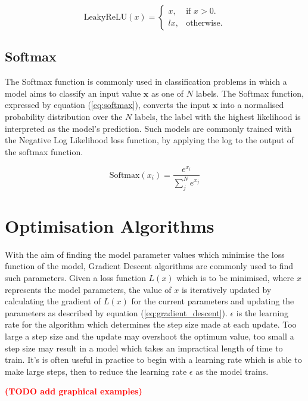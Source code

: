 \begin{equation}\label{eq:lrelu}
    \text{LeakyReLU}(x)=\begin{cases}
      x, & \text{if $x>0$}.\\
      lx, & \text{otherwise}.
    \end{cases}
\end{equation}

\subsection{Softmax} \label{softmax}
The Softmax function is commonly used in classification problems in which a model aims to classify an input value $\bm{x}$ as one of $N$ labels.
The Softmax function, expressed by equation (\ref{eq:softmax}), converts the input $\bm{x}$ into a normalised probability distribution over the $N$ labels, the label with the highest likelihood is interpreted as the model's prediction. 
Such models are commonly trained with the Negative Log Likelihood loss function, by applying the log to the output of the softmax function.

\begin{equation}\label{eq:softmax}
    \text{Softmax}(x_i) = \frac{e^{x_i}}{\sum_j^N e^{x_j}}
\end{equation}

\section{Optimisation Algorithms}
With the aim of finding the model parameter values which minimise the loss function of the model, Gradient Descent algorithms are commonly used to find such parameters.
Given a loss function $L(x)$ which is to be minimised, where $x$ represents the model parameters, the value of $x$ is iteratively updated by calculating the gradient of $L(x)$ for the current parameters and updating the parameters as described by equation (\ref{eq:gradient_descent}).
$\epsilon$ is the learning rate for the algorithm which determines the step size made at each update.
Too large a step size and the update may overshoot the optimum value, too small a step size may result in a model which takes an impractical length of time to train. 
It's is often useful in practice to begin with a learning rate which is able to make large steps, then to reduce the learning rate $\epsilon$ as the model trains.

\textcolor{red}{\textbf{(TODO add graphical examples)}}

